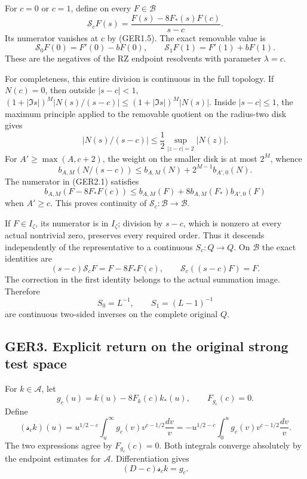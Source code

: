 For \(c=0\) or \(c=1\), define on every \(F\in\mathcal B\) \[
\mathscr S_cF(s)=\frac{F(s)-8F_*(s)F(c)}{s-c}.
\tag{GER2.1}
\] Its numerator vanishes at \(c\) by (GER1.5). The exact removable
value is \[
\mathscr S_0F(0)=F'(0)-bF(0),\qquad
\mathscr S_1F(1)=F'(1)+bF(1).
\tag{GER2.2}
\] These are the negatives of the RZ endpoint resolvents with parameter
\(\lambda=c\).

For completeness, this entire division is continuous in the full
topology. If \(N(c)=0\), then outside \(|s-c|<1\),
\((1+|\Im s|)^M|N(s)/(s-c)|\le(1+|\Im s|)^M|N(s)|\). Inside
\(|s-c|\le1\), the maximum principle applied to the removable quotient
on the radius-two disk gives \[
|N(s)/(s-c)|\le\frac12\sup_{|z-c|=2}|N(z)|.
\] For \(A'\ge\max(A,c+2)\), the weight on the smaller disk is at most
\(2^M\), whence \[
b_{A,M}(N/(s-c))\le b_{A,M}(N)+2^{M-1}b_{A',0}(N).
\tag{GER2.3}
\] The numerator in (GER2.1) satisfies \[
b_{A,M}(F-8F_*F(c))
\le b_{A,M}(F)+8b_{A,M}(F_*)b_{A',0}(F)
\] when \(A'\ge c\). This proves continuity of
\(\mathscr S_c:\mathcal B\to\mathcal B\).

If \(F\in I_\zeta\), its numerator is in \(I_\zeta\); division by
\(s-c\), which is nonzero at every actual nontrivial zero, preserves
every required order. Thus it descends independently of the
representative to a continuous \(S_c:Q\to Q\). On \(\mathcal B\) the
exact identities are \[
(s-c)\mathscr S_cF=F-8F_*F(c),\qquad
\mathscr S_c((s-c)F)=F.
\tag{GER2.4}
\] The correction in the first identity belongs to the actual summation
image. Therefore \[
\boxed{S_0=L^{-1},\qquad S_1=(L-1)^{-1}}
\tag{GER2.5}
\] are continuous two-sided inverses on the complete original \(Q\).

\subsection{GER3. Explicit return on the original strong test
space}\label{ger3.-explicit-return-on-the-original-strong-test-space}

For \(k\in\mathcal A\), let \[
g_c(u)=k(u)-8F_k(c)k_*(u),\qquad F_{g_c}(c)=0.
\tag{GER3.1}
\] Define \[
(\mathscr s_ck)(u)
=u^{1/2-c}\int_u^\infty g_c(v)v^{c-1/2}\frac{dv}{v}
=-u^{1/2-c}\int_0^u g_c(v)v^{c-1/2}\frac{dv}{v}.
\tag{GER3.2}
\] The two expressions agree by \(F_{g_c}(c)=0\). Both integrals
converge absolutely by the endpoint estimates for \(\mathcal A\).
Differentiation gives \[
(D-c)\mathscr s_ck=g_c.
\tag{GER3.3}
\]


